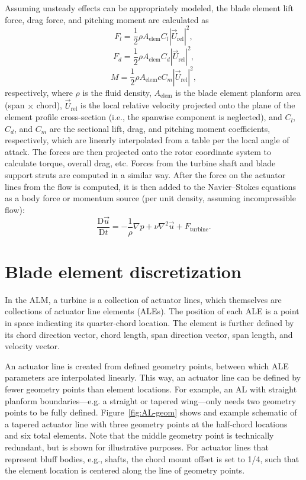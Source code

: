 \documentclass[times]{weauth}
\begin{document}
Assuming unsteady effects can be appropriately modeled, the blade element lift
force, drag force, and pitching moment are calculated as
\begin{equation}
    F_l = \frac{1}{2} \rho A_\mathrm{elem} C_l |\vec{U}_\mathrm{rel}|^2,
\end{equation}
\begin{equation}
    F_d = \frac{1}{2} \rho A_\mathrm{elem} C_d |\vec{U}_\mathrm{rel}|^2,
\end{equation}
\begin{equation}
    M = \frac{1}{2} \rho A_\mathrm{elem} c C_m |\vec{U}_\mathrm{rel}|^2,
\end{equation}
respectively, where $\rho$ is the fluid density, $A_\mathrm{elem}$ is the blade
element planform area (span $\times$ chord), $\vec{U}_\mathrm{rel}$ is the local
relative velocity projected onto the plane of the element profile cross-section
(i.e., the spanwise component is neglected), and $C_l$, $C_d$, and $C_m$ are the
sectional lift, drag, and pitching moment coefficients, respectively, which are
linearly interpolated from a table per the local angle of attack. The forces are
then projected onto the rotor coordinate system to calculate torque, overall
drag, etc. Forces from the turbine shaft and blade support struts are computed
in a similar way. After the force on the actuator lines from the flow is
computed, it is then added to the Navier--Stokes equations as a body force or
momentum source (per unit density, assuming incompressible flow):
\begin{equation}
    \frac{\mathrm{D} \vec{u}}{\mathrm{D} t} = - \frac{1}{\rho} \nabla p + \nu
    \nabla^2 \vec{u} + F_\mathrm{turbine}.
\end{equation}


\section{Blade element discretization}

In the ALM, a turbine is a collection of actuator lines, which themselves are
collections of actuator line elements (ALEs). The position of each ALE is a
point in space indicating its quarter-chord location. The element is further
defined by its chord direction vector, chord length, span direction vector, span
length, and velocity vector.

An actuator line is created from defined geometry points, between which ALE
parameters are interpolated linearly. This way, an actuator line can be defined
by fewer geometry points than element locations. For example, an AL with
straight planform boundaries---e.g. a straight or tapered wing---only needs two
geometry points to be fully defined. Figure~\ref{fig:AL-geom} shows and example
schematic of a tapered actuator line with three geometry points at the
half-chord locations and six total elements. Note that the middle geometry point
is technically redundant, but is shown for illustrative purposes. For actuator
lines that represent bluff bodies, e.g., shafts, the chord mount offset is set
to 1/4, such that the element location is centered along the line of geometry
points.
\end{document}
